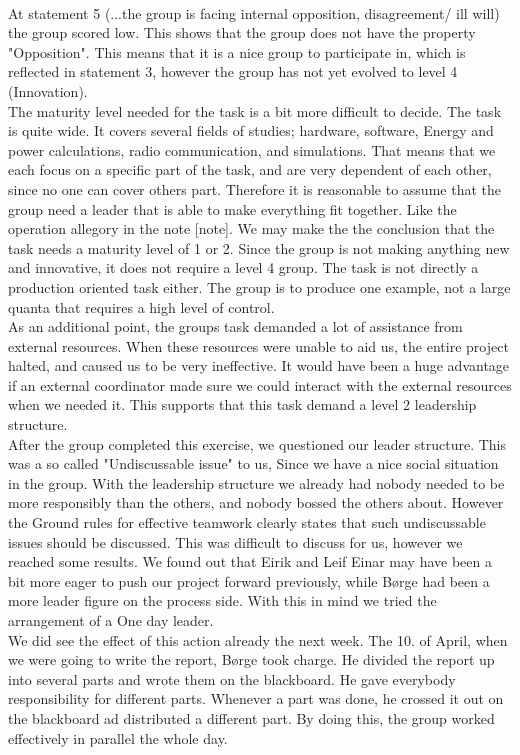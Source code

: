 \\
At statement 5 (...the group is facing internal opposition, disagreement/ ill will) the group scored low. This shows that the group does not have the property "Opposition". This means that it is a nice group to participate in, which is reflected in statement 3, however the group has not yet evolved to level 4 (Innovation).\cite{Maturity} 
\\	
The maturity level needed for the task is a bit more difficult to decide. The task is quite wide. It covers several fields of studies; hardware, software, Energy and power calculations, radio communication, and simulations. That means that we each focus on a specific part of the task, and are very dependent of each other, since no one can cover others part. Therefore it is reasonable to assume that the group need a leader that is able to make everything fit together. Like the operation allegory in the note [note]. We may make the the conclusion that the task needs a maturity level of 1 or 2. Since the group is not making anything new and innovative, it does not require a level 4 group. The task is not directly a production oriented task either. The group is to produce one example, not a large quanta that requires a high level of control.\cite{Maturity}  
\\
As an additional point, the groups task demanded a lot of assistance from external resources. When these resources were unable to aid us, the entire project halted, and caused us to be very ineffective. It would have been a huge advantage if an external coordinator made sure we could interact with the external resources when we needed it. This supports that this task demand a level 2 leadership structure.
\\
After the group completed this exercise, we questioned our leader structure. This was a so called "Undiscussable issue" to us, Since we have a nice social situation in the group. With the leadership structure we already had nobody needed to be more responsibly than the others, and nobody bossed the others about. However the Ground rules for effective teamwork clearly states that such undiscussable issues should be discussed\cite{EffectiveGroups}. This was difficult to discuss for us, however we reached some results. We found out that Eirik and Leif Einar may have been a bit more eager to push our project forward previously, while Børge had been a more leader figure on the process side. With this in mind we tried the arrangement of a One day leader. 
\\
We did see the effect of this action already the next week. The 10. of April, when we were going to write the report, Børge took charge. He divided the report up into several parts and wrote them on the blackboard. He gave everybody responsibility for different parts. Whenever a part was done, he crossed it out on the blackboard ad distributed a different part. By doing this, the group worked effectively in parallel the whole day. 
